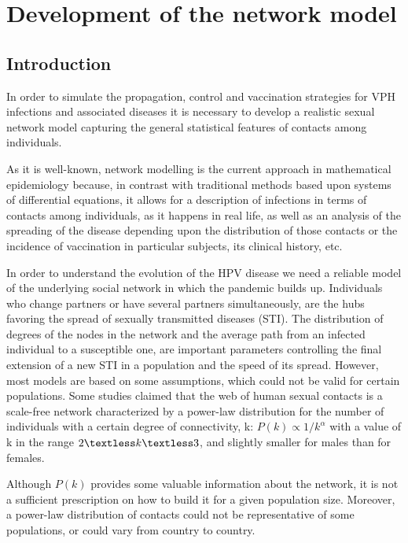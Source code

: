 
\chapter{Development of the network model}\label{Deliverable 1 Julio 2016}

\section{Introduction}
In order to simulate the propagation, control and vaccination strategies for VPH infections and associated diseases it is necessary to develop a realistic sexual network model capturing the general statistical features of contacts among individuals.

As it is well-known, network modelling is the current approach in mathematical epidemiology because, in contrast with traditional methods based upon systems of differential equations, it allows for a description of infections in terms of contacts among individuals, as it happens in real life, as well as an analysis of the spreading of the disease depending upon the distribution of those contacts or the incidence of vaccination in particular subjects, its clinical history, etc.

In order to understand the evolution of the HPV disease we need a reliable model of the underlying social network in which the pandemic builds up. Individuals who change partners or have several partners simultaneously, are the hubs favoring the spread of sexually transmitted diseases (STI). The distribution of degrees of the nodes in the network and the average path from an infected individual to a susceptible one, are important parameters controlling the final extension of a new STI in a population and the speed of its spread. However, most models are based on some assumptions, which could not be valid for certain populations. Some studies claimed that the web of human sexual contacts is a scale-free network characterized by a power-law distribution for the number of individuals with a certain degree of connectivity, k: $P(k)\propto1/k^\alpha$  with a value of k in the range $2 \textless k \textless 3$, and slightly smaller for males than for females.

Although $P(k)$ provides some valuable information about the network, it is not a sufficient prescription on how to build it for a given population size.
Moreover, a power-law distribution of contacts could not be representative of some populations, or could vary from country to country.

